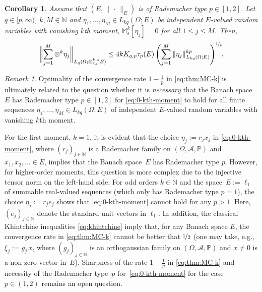 \documentclass[reqno]{amsart}
\numberwithin{equation}{section}
\newcommand{\bbM}{\mathbb{M}}
\newcommand{\bbN}{\mathbb{N}}
\newcommand{\bbP}{\mathbb{P}}
\newcommand{\cA}{\mathcal{A}}
\newcommand{\xk}{\otimes^k}
\newcommand{\xkseps}{\otimes^{k,s}_{\varepsilon_s}}
\newcommand{\Mk}{\bbM^k_\varepsilon}
\newcommand{\norm}[2]{     \| #1       \|_{ #2 }}
\newtheorem{corollary}[lemma]{Corollary}
\theoremstyle{remark}
\newtheorem{remark}[lemma]{Remark}
\theoremstyle{definition}
\begin{document}
\begin{corollary} 
	Assume that  
	$(E,\norm{\,\cdot\,}{E})$ 
	is of Rademacher type $p\in[1,2]$. 
	Let $q\in[p,\infty)$, $k,M\in\bbN$ 
	and $\eta_1,\ldots,\eta_M\in L_{kq}(\Omega;E)$ be 
	independent $E$-valued random variables 
	with vanishing $k$th moment, 
	$\Mk[\eta_j] = 0$ for all $1\leq j\leq M$. 
	Then, 
	\begin{equation}\label{eq:0-kth-moment}
		\biggl\| 
		\sum_{j=1}^M 
		\xk \eta_j 
		\biggr\|_{L_q(\Omega;\xkseps E)} 
		\leq 
		4 k K_{q,p} \tau_p(E) \,  
		\Biggl( 
		\sum_{j=1}^M
		\norm{ \eta_j }{L_{kq}(\Omega; E)}^{kp}  
		\Biggr)^{\nicefrac{1}{p}} \!. 
	\end{equation} 
\end{corollary} 
	
\begin{remark} 
	Optimality of the convergence rate 
	$1-\frac{1}{p}$ in \eqref{eq:thm:MC-k} 
	is ultimately related to the question  
	whether it is \emph{necessary} that the Banach space~$E$ 
	has Rademacher type $p\in[1,2]$ 
	for \eqref{eq:0-kth-moment} 
	to hold for all finite sequences 
	${\eta_1,\ldots,\eta_M\in L_{kq}(\Omega;E)}$ 
	of independent $E$-valued random variables 
	with vanishing $k$th moment. 
	 
	For the first moment, $k=1$, it is evident that 
	the choice $\eta_j := r_j x_j$ 
	in \eqref{eq:0-kth-moment}, 
	where $(r_j)_{j\in\bbN}$ is a Rademacher family 
	on $(\Omega,\cA,\bbP)$  
	and  $x_1,x_2,\ldots\in E$, 
	implies that the Banach space~$E$ 
	has Rademacher type $p$. 
	However, for higher-order moments, 
	this question is  
	more complex due to the injective 
	tensor norm on the left-hand side. 
	For odd orders $k\in\bbN$ and 
	the space~$E:=\ell_1$ 
	of summable real-valued sequences 
	(which only has Rademacher 
	type $p = 1$), 
	the choice $\eta_j := r_j e_j$ 
	shows that \eqref{eq:0-kth-moment} 
	cannot hold for any $p > 1$. 
	Here, $(e_j)_{j\in\bbN}$ denote the 
	standard unit vectors in $\ell_1$.  
	In addition, 
	the classical Khintchine inequalities \eqref{eq:khintchine} 
	imply that, for any Banach space $E$,
	the convergence rate in \eqref{eq:thm:MC-k} 
	cannot be better that $\nicefrac{1}{2}$ 
	(one may take, e.g., $\xi_j := g_j \, x$, 
	where $(g_j)_{j\in\bbN}$ is an 
	orthogaussian family on $(\Omega,\cA,\bbP)$ 
	and $x\neq 0$ is a non-zero vector in~$E$). 
	Sharpness of the rate 
	$1-\frac{1}{p}$ in \eqref{eq:thm:MC-k} 
	and necessity of the Rademacher type~$p$ 
	for~\eqref{eq:0-kth-moment} 
	for the case $p\in(1,2)$ 
	remains an open question. 
\end{remark}
\end{document}
